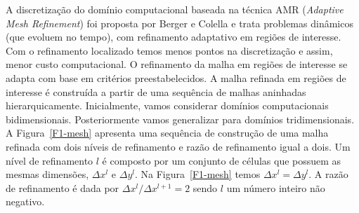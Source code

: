 \documentclass[12pt]{article}
\begin{document}
A discretização do domínio computacional baseada na técnica AMR ({\it Adaptive Mesh Refinement}) foi proposta por Berger e Colella \cite{BER91,BER84} e trata problemas dinâmicos (que evoluem no tempo), com refinamento adaptativo em regiões de interesse. Com o refinamento localizado temos menos pontos na discretização e assim, menor custo computacional. O refinamento da malha em regiões de interesse se adapta com base em critérios preestabelecidos. A malha refinada em regiões de interesse é construída a partir de uma sequência de malhas aninhadas hierarquicamente. Inicialmente, vamos considerar domínios computacionais bidimensionais. Posteriormente vamos generalizar para domínios tridimensionais. A Figura~\ref{F1-mesh} apresenta uma sequência de construção de uma malha refinada com dois níveis de refinamento e razão de refinamento igual a dois. Um nível de refinamento $l$ é composto por um conjunto de células que possuem as mesmas dimensões, $\Delta x^l$ e $\Delta y^l$. Na Figura~\ref{F1-mesh} temos $\Delta x^l = \Delta y^l$. A razão de refinamento é dada por $\Delta x^{l}/\Delta x^{l+1} = 2$ sendo $l$ um número inteiro não negativo. 
\end{document}
